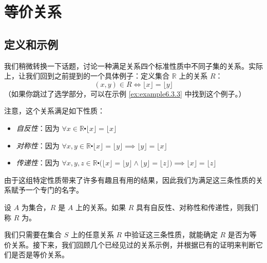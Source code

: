 \section{等价关系}

\subsection{定义和示例}

我们稍微转换一下话题，讨论一种满足关系四个标准性质中不同子集的关系。实际上，让我们回到之前提到的一个具体例子：定义集合 $\mathbb{R}$ 上的关系 $R$：
\[(x, y) \in R \iff \lfloor x \rfloor = \lfloor y \rfloor\]
（如果你跳过了选学部分，可以在示例 \ref{ex:example6.3.3} 中找到这个例子。）

注意，这个关系满足如下性质：
\begin{itemize}
    \item \emph{自反性}：因为 $\forall x \in \mathbb{R} \centerdot \lfloor x \rfloor = \lfloor x \rfloor$
    \item \emph{对称性}：因为 $\forall x, y \in \mathbb{R} \centerdot \lfloor x \rfloor = \lfloor y \rfloor \implies \lfloor y \rfloor = \lfloor x \rfloor$
    \item \emph{传递性}：因为 $\forall x, y, z \in \mathbb{R} \centerdot \big(\lfloor x \rfloor = \lfloor y \rfloor \land \lfloor y \rfloor = \lfloor z \rfloor \big) \implies \lfloor x \rfloor = \lfloor z \rfloor$
\end{itemize}
由于这组特定性质带来了许多有趣且有用的结果，因此我们为满足这三条性质的关系赋予一个专门的名字。

\begin{definition}
    设 $A$ 为集合，$R$ 是 $A$ 上的关系。如果 $R$ 具有自反性、对称性和传递性，则我们称 $R$ 为。
\end{definition}

我们只需要在集合 $S$ 上的任意关系 $R$ 中验证这三条性质，就能确定 $R$ 是否为等价关系。接下来，我们回顾几个已经见过的关系示例，并根据已有的证明来判断它们是否是等价关系。\\


